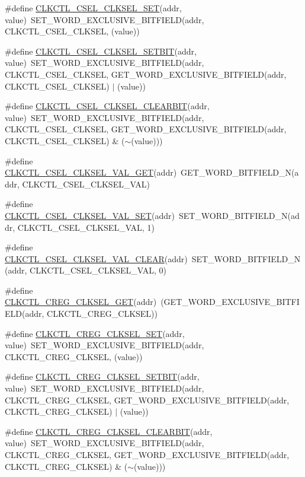 \begin{DoxyCompactItemize}
\#define \hyperlink{a00544_afa038683de3889151cb712fda5a6926d}{CLKCTL\_\-CSEL\_\-CLKSEL\_\-SET}(addr, value)~SET\_\-WORD\_\-EXCLUSIVE\_\-BITFIELD(addr, CLKCTL\_\-CSEL\_\-CLKSEL, (value))
\item 
\#define \hyperlink{a00544_abc3ab857e2f17eb6cd3158208feee2e0}{CLKCTL\_\-CSEL\_\-CLKSEL\_\-SETBIT}(addr, value)~SET\_\-WORD\_\-EXCLUSIVE\_\-BITFIELD(addr, CLKCTL\_\-CSEL\_\-CLKSEL, GET\_\-WORD\_\-EXCLUSIVE\_\-BITFIELD(addr, CLKCTL\_\-CSEL\_\-CLKSEL) $|$ (value))
\item 
\#define \hyperlink{a00544_a74d251d48648e84ca2931f7d6283147b}{CLKCTL\_\-CSEL\_\-CLKSEL\_\-CLEARBIT}(addr, value)~SET\_\-WORD\_\-EXCLUSIVE\_\-BITFIELD(addr, CLKCTL\_\-CSEL\_\-CLKSEL, GET\_\-WORD\_\-EXCLUSIVE\_\-BITFIELD(addr, CLKCTL\_\-CSEL\_\-CLKSEL) \& ($\sim$(value)))
\item 
\#define \hyperlink{a00544_aabc388721fab47642d374008bd14c314}{CLKCTL\_\-CSEL\_\-CLKSEL\_\-VAL\_\-GET}(addr)~GET\_\-WORD\_\-BITFIELD\_\-N(addr, CLKCTL\_\-CSEL\_\-CLKSEL\_\-VAL)
\item 
\#define \hyperlink{a00544_a1c07198e8ba480df7972e2ca3d013f0d}{CLKCTL\_\-CSEL\_\-CLKSEL\_\-VAL\_\-SET}(addr)~SET\_\-WORD\_\-BITFIELD\_\-N(addr, CLKCTL\_\-CSEL\_\-CLKSEL\_\-VAL, 1)
\item 
\#define \hyperlink{a00544_a15b01882fa49bf02335cf4441a0cc278}{CLKCTL\_\-CSEL\_\-CLKSEL\_\-VAL\_\-CLEAR}(addr)~SET\_\-WORD\_\-BITFIELD\_\-N(addr, CLKCTL\_\-CSEL\_\-CLKSEL\_\-VAL, 0)
\item 
\#define \hyperlink{a00544_a1b8042312691c2924671812d7755cd18}{CLKCTL\_\-CREG\_\-CLKSEL\_\-GET}(addr)~(GET\_\-WORD\_\-EXCLUSIVE\_\-BITFIELD(addr, CLKCTL\_\-CREG\_\-CLKSEL))
\item 
\#define \hyperlink{a00544_ad8ce54d5f39174980d04b03aa6fd0d59}{CLKCTL\_\-CREG\_\-CLKSEL\_\-SET}(addr, value)~SET\_\-WORD\_\-EXCLUSIVE\_\-BITFIELD(addr, CLKCTL\_\-CREG\_\-CLKSEL, (value))
\item 
\#define \hyperlink{a00544_ae3f7516c41bc6d1b91924ccfdccd70da}{CLKCTL\_\-CREG\_\-CLKSEL\_\-SETBIT}(addr, value)~SET\_\-WORD\_\-EXCLUSIVE\_\-BITFIELD(addr, CLKCTL\_\-CREG\_\-CLKSEL, GET\_\-WORD\_\-EXCLUSIVE\_\-BITFIELD(addr, CLKCTL\_\-CREG\_\-CLKSEL) $|$ (value))
\item 
\#define \hyperlink{a00544_a0952ac0544522daa3d5557c008d255e5}{CLKCTL\_\-CREG\_\-CLKSEL\_\-CLEARBIT}(addr, value)~SET\_\-WORD\_\-EXCLUSIVE\_\-BITFIELD(addr, CLKCTL\_\-CREG\_\-CLKSEL, GET\_\-WORD\_\-EXCLUSIVE\_\-BITFIELD(addr, CLKCTL\_\-CREG\_\-CLKSEL) \& ($\sim$(value)))
\item 

\end{DoxyCompactItemize}
